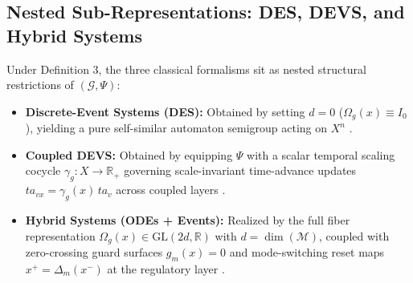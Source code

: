 \documentclass[11pt]{article}
\begin{document}
\subsection{Nested Sub-Representations: DES, DEVS, and Hybrid Systems}
Under Definition 3, the three classical formalisms sit as nested structural restrictions of $(\mathcal{G}, \Psi)$:
\begin{itemize}
    \item \textbf{Discrete-Event Systems (DES):} Obtained by setting $d = 0$ ($\Omega_g(x) \equiv I_0$), yielding a pure self-similar automaton semigroup acting on $X^n$ \cite{ZhongWonham1990}.
    \item \textbf{Coupled DEVS:} Obtained by equipping $\Psi$ with a scalar temporal scaling cocycle $\gamma_g : X \to \mathbb{R}_+$ governing scale-invariant time-advance updates $ta_{vx} = \gamma_g(x)\,ta_v$ across coupled layers \cite{Zeigler2018}.
    \item \textbf{Hybrid Systems (ODEs + Events):} Realized by the full fiber representation $\Omega_g(x) \in \mathrm{GL}(2d, \mathbb{R})$ with $d = \dim(\mathcal{M})$, coupled with zero-crossing guard surfaces $g_m(x) = 0$ and mode-switching reset maps $x^+ = \Delta_m(x^-)$ at the regulatory layer \cite{Borquez2026}.
\end{itemize}
\end{document}
